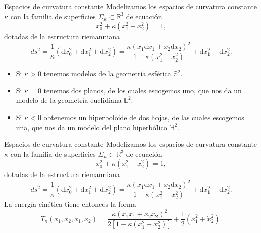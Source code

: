 \documentclass[aspectratio=169,mathserif]{beamer}
\begin{document}
  \begin{frame}{Espacios de curvatura constante}
    Modelizamos los espacios de curvatura constante $\kappa$ con la familia de superficies $\Sigma_\kappa \subset \mathbb{R}^3$ de ecuación
    \begin{equation*}
      x_0^2+\kappa(x_1^2+x_2^2)=1,
    \end{equation*}
    dotadas de la estructura riemanniana
    \begin{equation*}
      ds^2=\frac{1}{\kappa}(\mathrm{d}x_0^2+\mathrm{d}x_1^2+\mathrm{d}x_2^2)=\frac{\kappa(x_1\mathrm{d}x_1+x_2\mathrm{d}x_2 )^2}{1-\kappa (x_1^2+x_2^2)}+\mathrm{d}x_1^2+\mathrm{d}x_2^2.
    \end{equation*}
    \pause
    \begin{itemize}
      \item Si $\kappa>0$ tenemos modelos de la geometría esférica $\mathbb{S}^2$.
    \pause
      \item Si $\kappa=0$ tenemos dos planos, de los cuales escogemos uno, que nos da un modelo de la geometría euclidiana $\mathbb{E}^2$.
    \pause
      \item Si $\kappa<0$ obtenemos un hiperboloide de dos hojas, de las cuales escogemos una, que nos da un modelo del plano hiperbólico $\mathbb{H}^2$.
    \end{itemize}
  \end{frame}

  \begin{frame}{Espacios de curvatura constante}
    Modelizamos los espacios de curvatura constante $\kappa$ con la familia de superficies $\Sigma_\kappa \subset \mathbb{R}^3$ de ecuación
    \begin{equation*}
      x_0^2+\kappa(x_1^2+x_2^2)=1,
    \end{equation*}
    dotadas de la estructura riemanniana
    \begin{equation*}
      ds^2=\frac{1}{\kappa}(\mathrm{d}x_0^2+\mathrm{d}x_1^2+\mathrm{d}x_2^2)=\frac{\kappa(x_1\mathrm{d}x_1+x_2\mathrm{d}x_2 )^2}{1-\kappa (x_1^2+x_2^2)}+\mathrm{d}x_1^2+\mathrm{d}x_2^2.
    \end{equation*}
    La energía cinética tiene entonces la forma
    \begin{equation*}
      T_{\kappa}(x_1,x_2,\dot{x}_1,\dot{x}_2)=\frac{\kappa(x_1\dot{x}_1+x_2\dot{x}_2 )^2}{2[1-\kappa (x_1^2+x_2^2)]}+\frac{1}{2}(\dot{x}_1^2+\dot{x}_2^2).
    \end{equation*}
  \end{frame}
\end{document}
